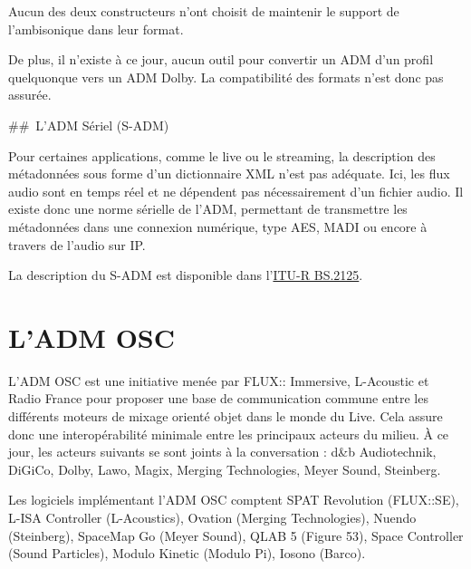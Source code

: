 \documentclass[
  letterpaper,
  DIV=11,
  numbers=noendperiod]{scrreprt}
\begin{document}
\begin{tcolorbox}[enhanced jigsaw, leftrule=.75mm, arc=.35mm, bottomtitle=1mm, colback=white, colbacktitle=quarto-callout-important-color!10!white, opacityback=0, left=2mm, rightrule=.15mm, opacitybacktitle=0.6, breakable, toptitle=1mm, titlerule=0mm, bottomrule=.15mm, toprule=.15mm, coltitle=black, title=\textcolor{quarto-callout-important-color}{\faExclamation}\hspace{0.5em}{Important}]

Aucun des deux constructeurs n'ont choisit de maintenir le support de
l'ambisonique dans leur format.

De plus, il n'existe à ce jour, aucun outil pour convertir un ADM d'un
profil quelquonque vers un ADM Dolby. La compatibilité des formats n'est
donc pas assurée.

\end{tcolorbox}

\#\#~L'ADM Sériel (S-ADM)

Pour certaines applications, comme le live ou le streaming, la
description des métadonnées sous forme d'un dictionnaire XML n'est pas
adéquate. Ici, les flux audio sont en temps réel et ne dépendent pas
nécessairement d'un fichier audio. Il existe donc une norme sérielle de
l'ADM, permettant de transmettre les métadonnées dans une connexion
numérique, type AES, MADI ou encore à travers de l'audio sur IP.

La description du S-ADM est disponible dans
l'\href{https://www.itu.int/rec/R-REC-BS.2125/en}{ITU-R BS.2125}.

\hypertarget{ladm-osc}{%
\section{L'ADM OSC}\label{ladm-osc}}

L'ADM OSC est une initiative menée par FLUX:: Immersive, L-Acoustic et
Radio France pour proposer une base de communication commune entre les
différents moteurs de mixage orienté objet dans le monde du Live. Cela
assure donc une interopérabilité minimale entre les principaux acteurs
du milieu. À ce jour, les acteurs suivants se sont joints à la
conversation : d\&b Audiotechnik, DiGiCo, Dolby, Lawo, Magix, Merging
Technologies, Meyer Sound, Steinberg.

Les logiciels implémentant l'ADM OSC comptent SPAT Revolution
(FLUX::SE), L-ISA Controller (L-Acoustics), Ovation (Merging
Technologies), Nuendo (Steinberg), SpaceMap Go (Meyer Sound), QLAB 5
(Figure 53), Space Controller (Sound Particles), Modulo Kinetic (Modulo
Pi), Iosono (Barco).
\end{document}
